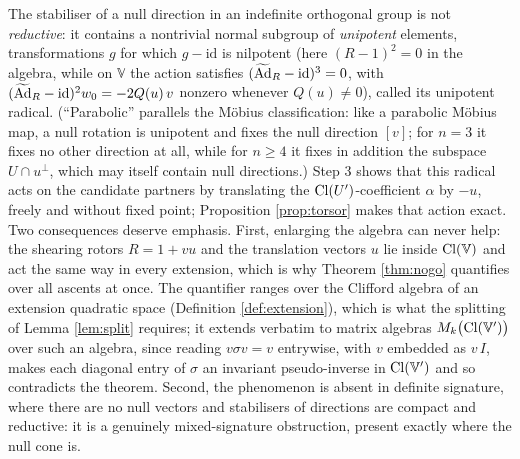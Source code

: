 \begin{remark}\label{rem:parabolic}
The stabiliser of a null direction in an indefinite orthogonal group is not \emph{reductive}: it contains a nontrivial normal subgroup of \emph{unipotent} elements, transformations $g$ for which $g - \mathrm{id}$ is nilpotent (here $(R-1)^2 = 0$ in the algebra, while on $\mathbb{V}$ the action satisfies $(\widetilde{\mathrm{Ad}}_R - \mathrm{id})^3 = 0$, with $(\widetilde{\mathrm{Ad}}_R - \mathrm{id})^2 w_0 = -2Q(u)\,v$ nonzero whenever $Q(u) \neq 0$), called its unipotent radical. (``Parabolic'' parallels the M\"obius classification: like a parabolic M\"obius map, a null rotation is unipotent and fixes the null direction $[v]$; for $n = 3$ it fixes no other direction at all, while for $n \geq 4$ it fixes in addition the subspace $U \cap u^{\perp}$, which may itself contain null directions.) Step 3 shows that this radical acts on the candidate partners by translating the $\mathrm{Cl}(U')$-coefficient $\alpha$ by $-u$, freely and without fixed point; Proposition \ref{prop:torsor} makes that action exact. Two consequences deserve emphasis. First, enlarging the algebra can never help: the shearing rotors $R = 1 + vu$ and the translation vectors $u$ lie inside $\mathrm{Cl}(\mathbb{V})$ and act the same way in every extension, which is why Theorem \ref{thm:nogo} quantifies over all ascents at once. The quantifier ranges over the Clifford algebra of an extension quadratic space (Definition \ref{def:extension}), which is what the splitting of Lemma \ref{lem:split} requires; it extends verbatim to matrix algebras $M_k\bigl(\mathrm{Cl}(\mathbb{V}')\bigr)$ over such an algebra, since reading $v\sigma v = v$ entrywise, with $v$ embedded as $v\,I$, makes each diagonal entry of $\sigma$ an invariant pseudo-inverse in $\mathrm{Cl}(\mathbb{V}')$ and so contradicts the theorem. Second, the phenomenon is absent in definite signature, where there are no null vectors and stabilisers of directions are compact and reductive: it is a genuinely mixed-signature obstruction, present exactly where the null cone is.
\end{remark}

